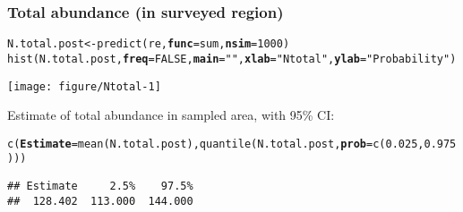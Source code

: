 \documentclass[color=usenames,dvipsnames]{beamer}\usepackage[]{graphicx}\usepackage[]{xcolor}
\makeatletter
\newcommand{\hlnum}[1]{\textcolor[rgb]{0.69,0.494,0}{#1}}%
\newcommand{\hlstr}[1]{\textcolor[rgb]{0.749,0.012,0.012}{#1}}%
\newcommand{\hlopt}[1]{\textcolor[rgb]{0,0,0}{#1}}%
\newcommand{\hlstd}[1]{\textcolor[rgb]{0,0,0}{#1}}%
\newcommand{\hlkwb}[1]{\textcolor[rgb]{0,0.341,0.682}{#1}}%
\newcommand{\hlkwc}[1]{\textcolor[rgb]{0,0,0}{\textbf{#1}}}%
\newcommand{\hlkwd}[1]{\textcolor[rgb]{0.004,0.004,0.506}{#1}}%
\newenvironment{kframe}{%
 \def\at@end@of@kframe{}%
 \ifinner\ifhmode%
  \def\at@end@of@kframe{\end{minipage}}%
  \begin{minipage}{\columnwidth}%
 \fi\fi%
 \def\FrameCommand##1{\hskip\@totalleftmargin \hskip-\fboxsep
 \colorbox{shadecolor}{##1}\hskip-\fboxsep
     \hskip-\linewidth \hskip-\@totalleftmargin \hskip\columnwidth}%
 \MakeFramed {\advance\hsize-\width
   \@totalleftmargin\z@ \linewidth\hsize
   \@setminipage}}%
 {\par\unskip\endMakeFramed%
 \at@end@of@kframe}
\newenvironment{knitrout}{}{} %
\makeatother
\begin{document}





\begin{frame}[fragile]
  \frametitle{Total abundance (in surveyed region)}
  \footnotesize
\begin{knitrout}\tiny
{}\color{fgcolor}\begin{kframe}
\begin{alltt}
\hlstd{N.total.post} \hlkwb{<-} \hlkwd{predict}\hlstd{(re,} \hlkwc{func}\hlstd{=sum,} \hlkwc{nsim}\hlstd{=}\hlnum{1000}\hlstd{)}
\hlkwd{hist}\hlstd{(N.total.post,} \hlkwc{freq}\hlstd{=}\hlnum{FALSE}\hlstd{,} \hlkwc{main}\hlstd{=}\hlstr{""}\hlstd{,} \hlkwc{xlab}\hlstd{=}\hlstr{"N total"}\hlstd{,} \hlkwc{ylab}\hlstd{=}\hlstr{"Probability"}\hlstd{)}
\end{alltt}
\end{kframe}

{\centering \texttt{[image: figure/Ntotal-1]} 

}


\end{knitrout}
Estimate of total abundance in sampled area, with 95\% CI:
\begin{knitrout}\tiny
{}\color{fgcolor}\begin{kframe}
\begin{alltt}
\hlkwd{c}\hlstd{(}\hlkwc{Estimate}\hlstd{=}\hlkwd{mean}\hlstd{(N.total.post),} \hlkwd{quantile}\hlstd{(N.total.post,} \hlkwc{prob}\hlstd{=}\hlkwd{c}\hlstd{(}\hlnum{0.025}\hlstd{,} \hlnum{0.975}\hlstd{)))}
\end{alltt}
\begin{verbatim}
## Estimate     2.5%    97.5% 
##  128.402  113.000  144.000
\end{verbatim}
\end{kframe}
\end{knitrout}
\end{frame}
\end{document}
